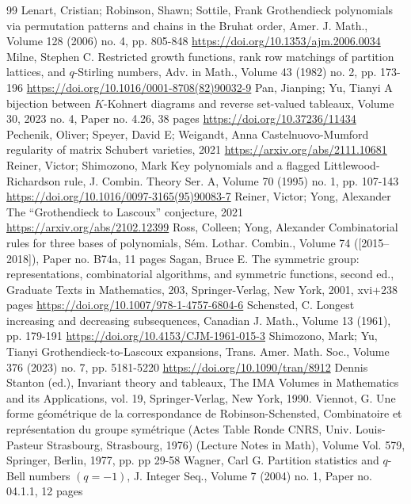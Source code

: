 \begin{thebibliography}{99}
 Lenart, Cristian; Robinson, Shawn; Sottile, Frank Grothendieck polynomials via permutation patterns and chains in the Bruhat order, Amer. J. Math., Volume 128 (2006) no. 4, pp. 805-848 \url{https://doi.org/10.1353/ajm.2006.0034}
 Milne, Stephen C. Restricted growth functions, rank row matchings of partition lattices, and $q$-Stirling numbers, Adv. in Math., Volume 43 (1982) no. 2, pp. 173-196 \url{https://doi.org/10.1016/0001-8708(82)90032-9}
 Pan, Jianping; Yu, Tianyi A bijection between $K$-Kohnert diagrams and reverse set-valued tableaux, Volume 30, 2023 no. 4, Paper no. 4.26, 38 pages \url{https://doi.org/10.37236/11434}
 Pechenik, Oliver; Speyer, David E; Weigandt, Anna Castelnuovo-Mumford regularity of matrix Schubert varieties, 2021 \url{https://arxiv.org/abs/2111.10681}
 Reiner, Victor; Shimozono, Mark Key polynomials and a flagged Littlewood-Richardson rule, J. Combin. Theory Ser. A, Volume 70 (1995) no. 1, pp. 107-143 \url{https://doi.org/10.1016/0097-3165(95)90083-7}
 Reiner, Victor; Yong, Alexander The “Grothendieck to Lascoux” conjecture, 2021 \url{https://arxiv.org/abs/2102.12399}
 Ross, Colleen; Yong, Alexander Combinatorial rules for three bases of polynomials, Sém. Lothar. Combin., Volume 74 ([2015–2018]), Paper no. B74a, 11 pages
 Sagan, Bruce E. The symmetric group: representations, combinatorial algorithms, and symmetric functions, second ed., Graduate Texts in Mathematics, 203, Springer-Verlag, New York, 2001, xvi+238 pages \url{https://doi.org/10.1007/978-1-4757-6804-6}
 Schensted, C. Longest increasing and decreasing subsequences, Canadian J. Math., Volume 13 (1961), pp. 179-191 \url{https://doi.org/10.4153/CJM-1961-015-3}
 Shimozono, Mark; Yu, Tianyi Grothendieck-to-Lascoux expansions, Trans. Amer. Math. Soc., Volume 376 (2023) no. 7, pp. 5181-5220 \url{https://doi.org/10.1090/tran/8912}
 Dennis Stanton (ed.), Invariant theory and tableaux, The IMA Volumes in Mathematics and its Applications, vol. 19, Springer-Verlag, New York, 1990.
 Viennot, G. Une forme géométrique de la correspondance de Robinson-Schensted, Combinatoire et représentation du groupe symétrique (Actes Table Ronde CNRS, Univ. Louis-Pasteur Strasbourg, Strasbourg, 1976) (Lecture Notes in Math), Volume Vol. 579, Springer, Berlin, 1977, pp. pp 29-58
 Wagner, Carl G. Partition statistics and $q$-Bell numbers $(q=-1)$, J. Integer Seq., Volume 7 (2004) no. 1, Paper no. 04.1.1, 12 pages
\end{thebibliography}
